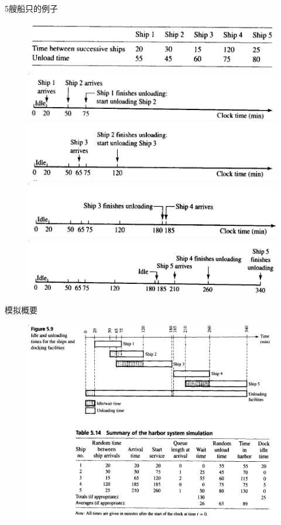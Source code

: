 \documentclass[UTF8]{ctexbeamer}
\begin{document}
\begin{frame}{5艘船只的例子}
  \begin{figure}
    \includegraphics[width=.7\textwidth{}]{ships.png}\\
    \includegraphics[width=.5\textwidth{}]{ship-t1.png}
    \includegraphics[width=.5\textwidth{}]{ship-t2.png}\\
    \includegraphics[width=.5\textwidth{}]{ship-t3.png}
    \includegraphics[width=.5\textwidth{}]{ship-t4.png}
  \end{figure}  
  
\end{frame}

\begin{frame}{模拟概要}
  \begin{figure}
    \includegraphics[height=.85\textheight{}]{ship-summary.png}
  \end{figure}  

\end{frame}
\end{document}
